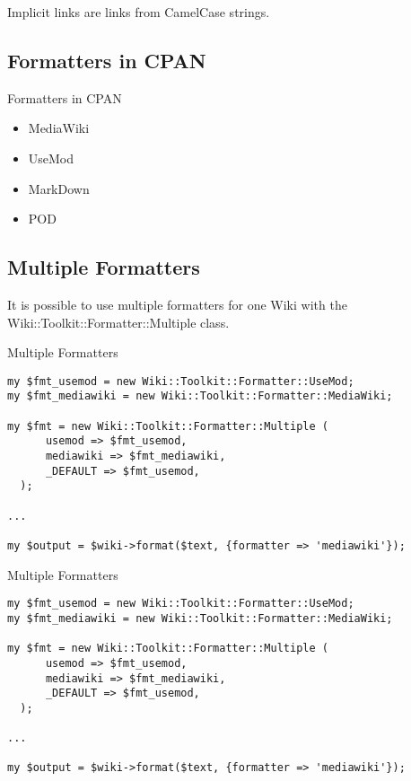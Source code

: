 Implicit links are links from CamelCase strings.



\subsection{Formatters in CPAN}

\begin{frame}{Formatters in CPAN}
 \begin{itemize}
  \item MediaWiki
  \item UseMod
  \item MarkDown
  \item POD
 \end{itemize}
\end{frame}

\subsection{Multiple Formatters}

It is possible to use multiple formatters for one Wiki with
the Wiki::Toolkit::Formatter::Multiple class.

\begin{frame}[fragile]{Multiple Formatters}
\begin{lstlisting}
my $fmt_usemod = new Wiki::Toolkit::Formatter::UseMod;
my $fmt_mediawiki = new Wiki::Toolkit::Formatter::MediaWiki;

my $fmt = new Wiki::Toolkit::Formatter::Multiple (
      usemod => $fmt_usemod,
      mediawiki => $fmt_mediawiki,
      _DEFAULT => $fmt_usemod,
  );

...

my $output = $wiki->format($text, {formatter => 'mediawiki'});
\end{lstlisting}
\end{frame}

\begin{frame}[fragile]{Multiple Formatters}
\begin{lstlisting}
my $fmt_usemod = new Wiki::Toolkit::Formatter::UseMod;
my $fmt_mediawiki = new Wiki::Toolkit::Formatter::MediaWiki;

my $fmt = new Wiki::Toolkit::Formatter::Multiple (
      usemod => $fmt_usemod,
      mediawiki => $fmt_mediawiki,
      _DEFAULT => $fmt_usemod,
  );

...

my $output = $wiki->format($text, {formatter => 'mediawiki'});
\end{lstlisting}
\end{frame}

